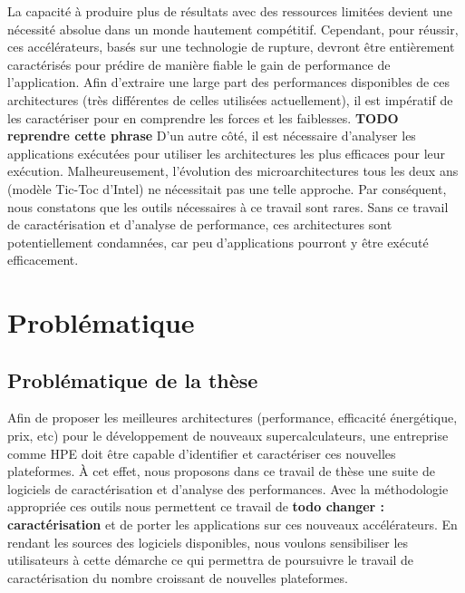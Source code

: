     
        La capacité à produire plus de résultats avec des ressources limitées devient une nécessité absolue dans un monde hautement compétitif. Cependant, pour réussir, ces accélérateurs, basés sur une technologie de rupture, devront être entièrement caractérisés pour prédire de manière fiable le gain de performance de l'application. Afin d'extraire une large part des performances disponibles de ces architectures (très différentes de celles utilisées actuellement), il est impératif de les caractériser pour en comprendre les forces et les faiblesses. \textbf{TODO reprendre cette phrase} D'un autre côté, il est nécessaire d'analyser les applications exécutées pour utiliser les architectures les plus efficaces pour leur exécution. Malheureusement, l'évolution des microarchitectures tous les deux ans (modèle Tic-Toc d'Intel) ne nécessitait pas une telle approche. Par conséquent, nous constatons que les outils nécessaires à ce travail sont rares. Sans ce travail de caractérisation et d'analyse de performance, ces architectures sont potentiellement condamnées, car peu d'applications pourront y être exécuté efficacement.
      

\section{Problématique}
         
         
    \subsection{Problématique de la thèse}
    
        Afin de proposer les meilleures architectures (performance, efficacité énergétique, prix, etc) pour le développement de nouveaux supercalculateurs, une entreprise comme HPE doit être capable d'identifier et caractériser ces nouvelles plateformes. À cet effet, nous proposons dans ce travail de thèse une suite de logiciels de caractérisation et d'analyse des performances. Avec la méthodologie appropriée ces outils nous permettent ce travail de \textbf{todo changer : caractérisation} et de porter les applications sur ces nouveaux accélérateurs. En rendant les sources des logiciels disponibles, nous voulons sensibiliser les utilisateurs à cette démarche ce qui permettra de poursuivre le travail de caractérisation du nombre croissant de nouvelles plateformes.
 
